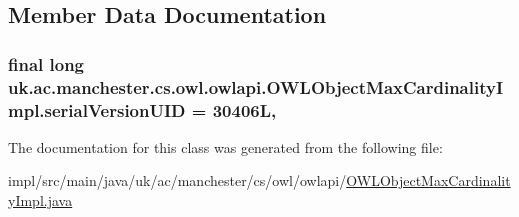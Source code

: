 \subsection{Member Data Documentation}
\hypertarget{classuk_1_1ac_1_1manchester_1_1cs_1_1owl_1_1owlapi_1_1_o_w_l_object_max_cardinality_impl_aae71ca84a52f5ab350a60c0cee8ce66c}{
\subsubsection[{serial\-Version\-U\-I\-D}]{\setlength{\rightskip}{0pt plus 5cm}final long uk.\-ac.\-manchester.\-cs.\-owl.\-owlapi.\-O\-W\-L\-Object\-Max\-Cardinality\-Impl.\-serial\-Version\-U\-I\-D = 30406\-L\hspace{0.3cm}{\ttfamily [static]}, {\ttfamily [private]}}}\label{classuk_1_1ac_1_1manchester_1_1cs_1_1owl_1_1owlapi_1_1_o_w_l_object_max_cardinality_impl_aae71ca84a52f5ab350a60c0cee8ce66c}


The documentation for this class was generated from the following file\-:\begin{DoxyCompactItemize}
\item 
impl/src/main/java/uk/ac/manchester/cs/owl/owlapi/\hyperlink{_o_w_l_object_max_cardinality_impl_8java}{O\-W\-L\-Object\-Max\-Cardinality\-Impl.\-java}\end{DoxyCompactItemize}
